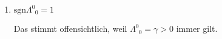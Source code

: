 \documentclass{exercise}
\begin{document}
\begin{enumerate}
{\begin{enumerate}
\begin{align*}
\begin{pmatrix}
                    0 & 0 & 0 & 1  
                    \end{pmatrix} \\
                    &= \begin{pmatrix}
                    1 & 0 & 0 & 0 \\
                    0 & -1 & 0 & 0 \\
                    0 & 0 & -1 & 0 \\
                    0 & 0 & 0 & -1
                    \end{pmatrix} = g \, 
            \end{align*}
            wobei wir $\gamma^2 = 1 - \beta^2$ nutzen.

            \item  $\text{sgn} \Lambda^0_{\phantom{0} 0} = 1$

            Das stimmt offensichtlich, weil $\Lambda^0_{\phantom{0} 0} = \gamma > 0$ immer gilt.


\end{enumerate}}
\end{enumerate}
\end{document}
